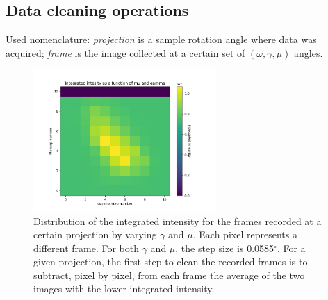 \documentclass[11pt]{scrartcl}
\begin{document}
\subsection{Data cleaning operations}
\label{subs:data_cleaning}

Used nomenclature: {\emph{projection}} is a sample rotation angle where data was acquired; {\emph{frame}} is the image collected at a certain set of $(\omega, \gamma, \mu)$ angles.

\begin{figure}[h]
    \centering
    \includegraphics[width=0.62\textwidth]{Distr_I_int}
    \caption{Distribution of the integrated intensity for the frames recorded at a certain projection by varying $\gamma$ and $\mu$. Each pixel represents a different frame. For both $\gamma$ and $\mu$, the step size is 0.0585$^{\circ}$. For a given projection, the first step to clean the recorded frames is to subtract, pixel by pixel, from each frame the average of the two images with the lower integrated intensity.}
    \label{fig:distr_I_int}
\end{figure}
\end{document}
